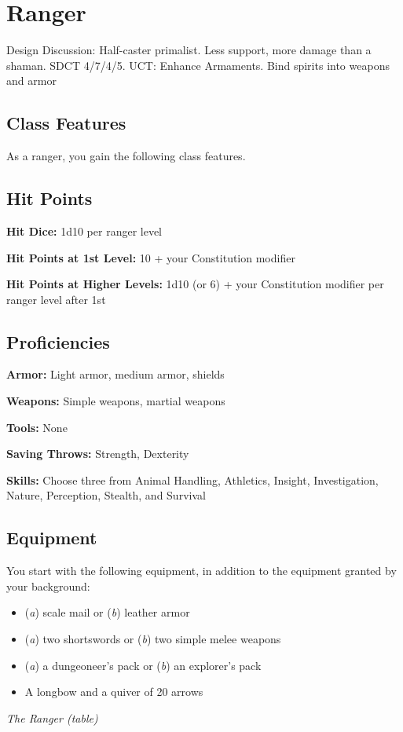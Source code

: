 \section{Ranger}

Design Discussion: Half-caster primalist. Less support, more damage than a shaman. SDCT 4/7/4/5. UCT: Enhance Armaments. Bind spirits into weapons and armor

\subsection{Class Features}

As a ranger, you gain the following class features.

\subsection{Hit Points}

\textbf{Hit Dice:} 1d10 per ranger level

\textbf{Hit Points at 1st Level:} 10 + your Constitution modifier

\textbf{Hit Points at Higher Levels:} 1d10 (or 6) + your Constitution modifier per ranger level after 1st

\subsection{Proficiencies}

\textbf{Armor:} Light armor, medium armor, shields

\textbf{Weapons:} Simple weapons, martial weapons

\textbf{Tools:} None

\textbf{Saving Throws:} Strength, Dexterity

\textbf{Skills:} Choose three from Animal Handling, Athletics, Insight, Investigation, Nature, Perception, Stealth, and Survival

\subsection{Equipment}

You start with the following equipment, in addition to the equipment granted by your background:
\begin{itemize}
\item (\textit{a}) scale mail or (\textit{b}) leather armor
\item (\textit{a}) two shortswords or (\textit{b}) two simple melee weapons
\item (\textit{a}) a dungeoneer's pack or (\textit{b}) an explorer's pack
\item A longbow and a quiver of 20 arrows
\end{itemize}
\textit{The Ranger (table)}

